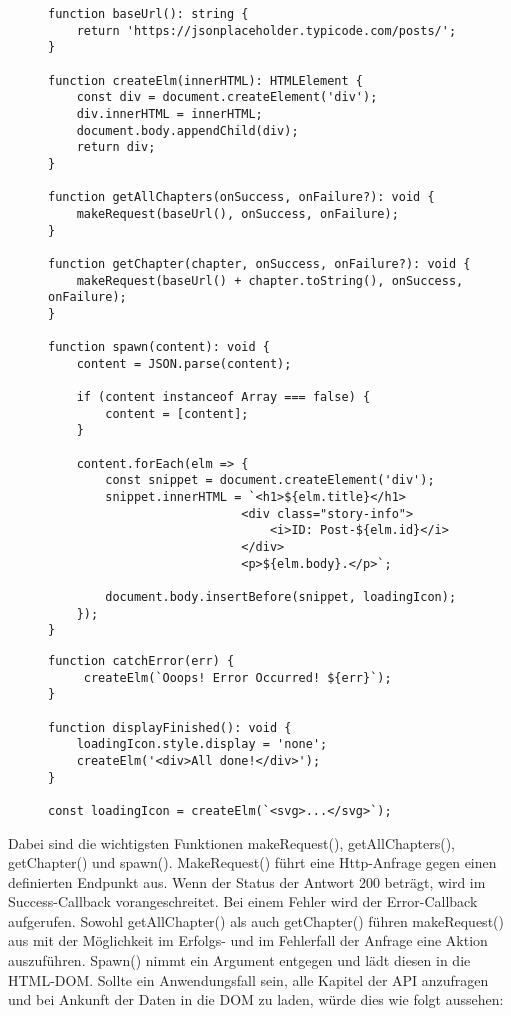 \begin{figure}[H]
\begin{lstlisting}[basicstyle=\small]
function baseUrl(): string {
    return 'https://jsonplaceholder.typicode.com/posts/';
}

function createElm(innerHTML): HTMLElement {
    const div = document.createElement('div');
    div.innerHTML = innerHTML;
    document.body.appendChild(div);
    return div;
}

function getAllChapters(onSuccess, onFailure?): void {
    makeRequest(baseUrl(), onSuccess, onFailure);
}

function getChapter(chapter, onSuccess, onFailure?): void {
    makeRequest(baseUrl() + chapter.toString(), onSuccess, onFailure);
}

function spawn(content): void {
    content = JSON.parse(content);

    if (content instanceof Array === false) {
        content = [content];
    }

    content.forEach(elm => {
        const snippet = document.createElement('div');
        snippet.innerHTML = `<h1>${elm.title}</h1>
                           <div class="story-info">
                               <i>ID: Post-${elm.id}</i>
                           </div>
                           <p>${elm.body}.</p>`;

        document.body.insertBefore(snippet, loadingIcon);
    });
}
\end{lstlisting}
\end{figure}

\begin{figure}[H]
\begin{lstlisting}[basicstyle=\small]
function catchError(err) {
     createElm(`Ooops! Error Occurred! ${err}`);
}

function displayFinished(): void {
    loadingIcon.style.display = 'none';
    createElm('<div>All done!</div>');
}

const loadingIcon = createElm(`<svg>...</svg>`);
\end{lstlisting}
\end{figure}

\noindent
Dabei sind die wichtigsten Funktionen makeRequest(), getAllChapters(), getChapter() und spawn(). MakeRequest() führt eine Http-Anfrage gegen einen definierten Endpunkt aus. Wenn der Status der Antwort 200 beträgt, wird im Success-Callback vorangeschreitet. Bei einem Fehler wird der Error-Callback aufgerufen. Sowohl getAllChapter() als auch getChapter() führen makeRequest() aus mit der Möglichkeit im Erfolgs- und im Fehlerfall der Anfrage eine Aktion auszuführen. Spawn() nimmt ein Argument entgegen und lädt diesen in die HTML-DOM. Sollte ein Anwendungsfall sein, alle Kapitel der API anzufragen und bei Ankunft der Daten in die DOM zu laden, würde dies wie folgt aussehen:

